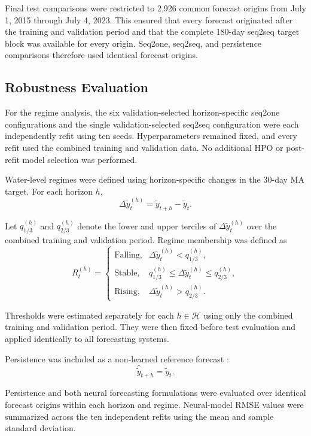 \documentclass[conference]{IEEEtran}
\begin{document}
Final test comparisons were restricted to 2,926 common forecast origins from July 1, 2015 through July 4, 2023. This ensured that every forecast originated after the training and validation period and that the complete 180-day seq2seq target block was available for every origin. Seq2one, seq2seq, and persistence comparisons therefore used identical forecast origins.


\subsection{Robustness Evaluation}

For the regime analysis, the six validation-selected horizon-specific seq2one configurations and the single validation-selected seq2seq configuration were each independently refit using ten seeds. Hyperparameters remained fixed, and every refit used the combined training and validation data. No additional HPO or post-refit model selection was performed.

Water-level regimes were defined using horizon-specific changes in the 30-day MA target. For each horizon $h$,
\[
    \Delta \tilde{y}_t^{(h)}
    =
    \tilde{y}_{t+h}-\tilde{y}_t.
\]

Let $q_{1/3}^{(h)}$ and $q_{2/3}^{(h)}$ denote the lower and upper terciles of $\Delta \tilde{y}_t^{(h)}$ over the combined training and validation period. Regime membership was defined as
\[
    R_t^{(h)} =
    \begin{cases}
    \text{Falling}, & \Delta \tilde{y}_t^{(h)} < q_{1/3}^{(h)}, \\[4pt]
    \text{Stable}, & q_{1/3}^{(h)} \le \Delta \tilde{y}_t^{(h)} \le q_{2/3}^{(h)}, \\[4pt]
    \text{Rising}, & \Delta \tilde{y}_t^{(h)} > q_{2/3}^{(h)}.
    \end{cases}
\]

Thresholds were estimated separately for each $h \in \mathcal{H}$ using only the combined training and validation period. They were then fixed before test evaluation and applied identically to all forecasting systems.

Persistence was included as a non-learned reference forecast \cite{hyndman2021forecasting}:
\[
    \hat{\tilde{y}}_{t+h} = \tilde{y}_t.
\]

Persistence and both neural forecasting formulations were evaluated over identical forecast origins within each horizon and regime. Neural-model RMSE values were summarized across the ten independent refits using the mean and sample standard deviation.
\end{document}
